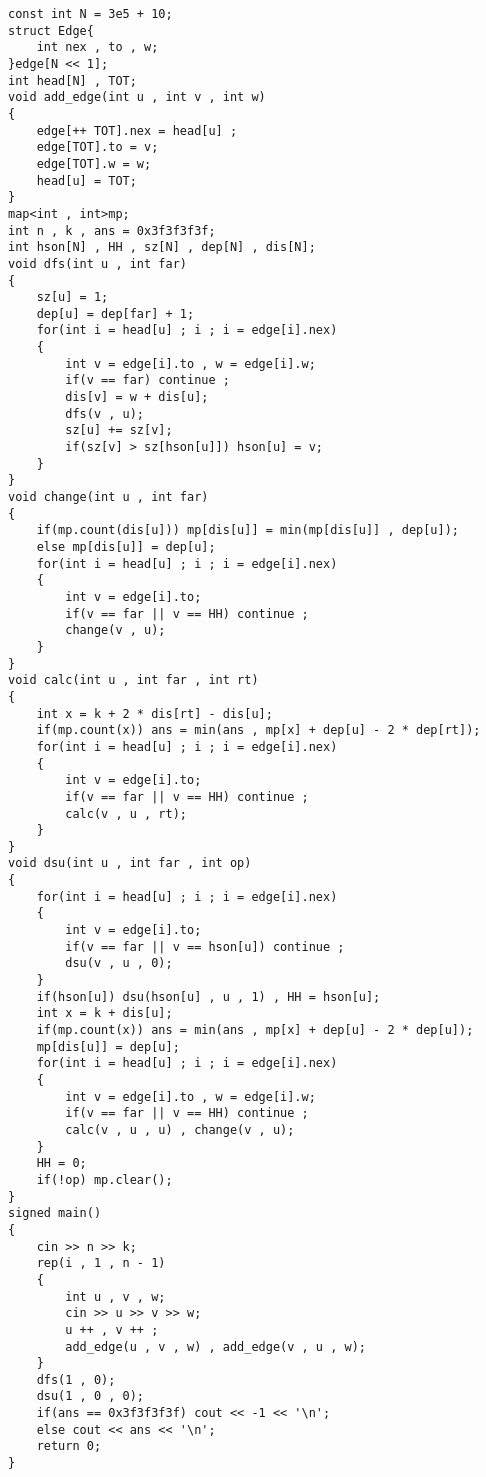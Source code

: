 \documentclass[E:/GsjzTle/main/main.tex]{subfiles}
\begin{document}
\begin{lstlisting}
const int N = 3e5 + 10;
struct Edge{
	int nex , to , w;
}edge[N << 1];
int head[N] , TOT;
void add_edge(int u , int v , int w)
{
	edge[++ TOT].nex = head[u] ;
	edge[TOT].to = v;
	edge[TOT].w = w;
	head[u] = TOT;
}
map<int , int>mp;
int n , k , ans = 0x3f3f3f3f;
int hson[N] , HH , sz[N] , dep[N] , dis[N];
void dfs(int u , int far)
{
	sz[u] = 1;
	dep[u] = dep[far] + 1;
	for(int i = head[u] ; i ; i = edge[i].nex)
	{
		int v = edge[i].to , w = edge[i].w;
		if(v == far) continue ;
		dis[v] = w + dis[u];
		dfs(v , u);
		sz[u] += sz[v];
		if(sz[v] > sz[hson[u]]) hson[u] = v;
	}
}
void change(int u , int far)
{
	if(mp.count(dis[u])) mp[dis[u]] = min(mp[dis[u]] , dep[u]);
	else mp[dis[u]] = dep[u];
	for(int i = head[u] ; i ; i = edge[i].nex)
	{
		int v = edge[i].to;
		if(v == far || v == HH) continue ;
		change(v , u);	
	} 
}
void calc(int u , int far , int rt)
{	
	int x = k + 2 * dis[rt] - dis[u];
	if(mp.count(x)) ans = min(ans , mp[x] + dep[u] - 2 * dep[rt]);
	for(int i = head[u] ; i ; i = edge[i].nex)
	{
		int v = edge[i].to;
		if(v == far || v == HH) continue ;
		calc(v , u , rt);
	}
}
void dsu(int u , int far , int op)
{
	for(int i = head[u] ; i ; i = edge[i].nex)
	{
		int v = edge[i].to;
		if(v == far || v == hson[u]) continue ;
		dsu(v , u , 0);
	}
	if(hson[u]) dsu(hson[u] , u , 1) , HH = hson[u];
	int x = k + dis[u];
	if(mp.count(x)) ans = min(ans , mp[x] + dep[u] - 2 * dep[u]); 
	mp[dis[u]] = dep[u];
	for(int i = head[u] ; i ; i = edge[i].nex)
	{
		int v = edge[i].to , w = edge[i].w;
		if(v == far || v == HH) continue ;
		calc(v , u , u) , change(v , u);	
	}
	HH = 0;
	if(!op) mp.clear(); 
}
signed main()
{
	cin >> n >> k;
	rep(i , 1 , n - 1)
	{
		int u , v , w;
		cin >> u >> v >> w;
		u ++ , v ++ ;
		add_edge(u , v , w) , add_edge(v , u , w);
	}
	dfs(1 , 0);
	dsu(1 , 0 , 0);
	if(ans == 0x3f3f3f3f) cout << -1 << '\n';
	else cout << ans << '\n';
	return 0;
}
\end{lstlisting}
\end{document}
